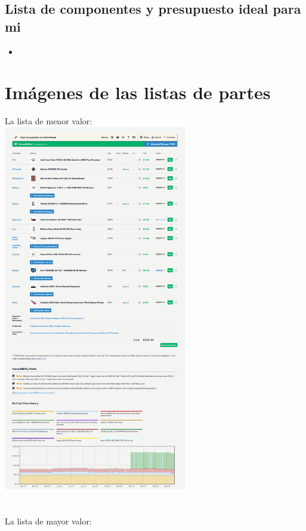 \documentclass[12pt, a4paper, twocolumn]{article}
\begin{document}
\subsection{Lista de componentes y presupuesto ideal para mi}
\begin{itemize}
    \item 
\end{itemize}
\section{Imágenes de las listas de partes}
\onecolumn
La lista de menor valor: \\
\includegraphics[width=0.6\textwidth]{Minimal.png} \\ \\ \\
La lista de mayor valor: \\
\end{document}

